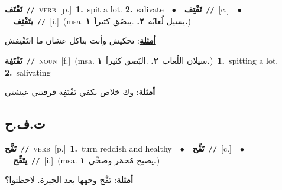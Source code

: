 \documentclass[10pt,a4paper,twoside]{article} %
\begin{document}
\begin{multicols}{2}
{\setlength\topsep{0pt}\textbf{\foreignlanguage{arabic}{تَفْتَف}}\ {\color{gray}\texttt{//}\color{black}}\ \textsc{verb}\ [p.]\ \textbf{1.}~spit a lot.  \textbf{2.}~salivate\ \ $\bullet$\ \ \setlength\topsep{0pt}\textbf{\foreignlanguage{arabic}{تَفْتِف}}\ {\color{gray}\texttt{//}\color{black}}\ [c.]\ \ $\bullet$\ \ \setlength\topsep{0pt}\textbf{\foreignlanguage{arabic}{يتَفْتِف}}\ {\color{gray}\texttt{//}\color{black}}\ [i.]\ \color{gray}(msa. \foreignlanguage{arabic}{يسيل لُعابُه}~\foreignlanguage{arabic}{\textbf{٢.}}  .\foreignlanguage{arabic}{يبصُق كثيراََ}~\foreignlanguage{arabic}{\textbf{١.}})\color{black}\  \begin{flushright}\color{gray}\foreignlanguage{arabic}{\textbf{\underline{\foreignlanguage{arabic}{أمثلة}}}: تحكيش وأنت بتاكل عشان ما اتتَفْتِفش}\end{flushright}\color{black}} \vspace{2mm}

{\setlength\topsep{0pt}\textbf{\foreignlanguage{arabic}{تَفْتَفِة}}\ {\color{gray}\texttt{//}\color{black}}\ \textsc{noun}\ [f.]\ \color{gray}(msa. \foreignlanguage{arabic}{سيلان اللُعاب}~\foreignlanguage{arabic}{\textbf{٢.}}  .\foreignlanguage{arabic}{البَصق كثيراََ}~\foreignlanguage{arabic}{\textbf{١.}})\color{black}\ \textbf{1.}~spitting a lot.  \textbf{2.}~salivating\  \begin{flushright}\color{gray}\foreignlanguage{arabic}{\textbf{\underline{\foreignlanguage{arabic}{أمثلة}}}: وك خلاص بكفي تَفْتَفِة قرفتني عيشتي}\end{flushright}\color{black}} \vspace{2mm}

\vspace{-3mm}
\subsection*{\color{blue}\foreignlanguage{arabic}{ت.ف.ح}\color{blue}{}} 

{\setlength\topsep{0pt}\textbf{\foreignlanguage{arabic}{تَفَّح}}\ {\color{gray}\texttt{//}\color{black}}\ \textsc{verb}\ [p.]\ \textbf{1.}~turn reddish and healthy\ \ $\bullet$\ \ \setlength\topsep{0pt}\textbf{\foreignlanguage{arabic}{تَفِّح}}\ {\color{gray}\texttt{//}\color{black}}\ [c.]\ \ $\bullet$\ \ \setlength\topsep{0pt}\textbf{\foreignlanguage{arabic}{يتَفِّح}}\ {\color{gray}\texttt{//}\color{black}}\ [i.]\ \color{gray}(msa. \foreignlanguage{arabic}{يصبح مُحمَر وصحِّي}~\foreignlanguage{arabic}{\textbf{١.}})\color{black}\  \begin{flushright}\color{gray}\foreignlanguage{arabic}{\textbf{\underline{\foreignlanguage{arabic}{أمثلة}}}: تَفَّح وجهها بعد الجيزة. لاحظتوا؟}\end{flushright}\color{black}} \vspace{2mm}


\end{multicols}
\end{document}
